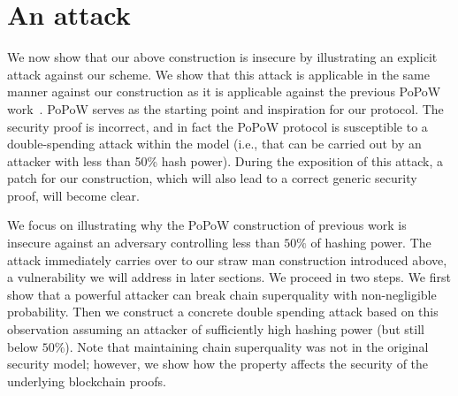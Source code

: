 \section{An attack}
\label{sec:attack}

We now show that our above construction is insecure by illustrating an explicit
attack against our scheme. We show that this attack is applicable in the same
manner against our construction as it is applicable against the previous
PoPoW work~\cite{KLS}. PoPoW serves as the starting point and inspiration for
our protocol. The security proof is incorrect, and in fact the PoPoW protocol is
susceptible to a double-spending attack within the model (i.e., that can be
carried out by an attacker with less than 50\% hash power). During the
exposition of this attack, a patch for our construction, which will also lead to
a correct generic security proof, will become clear.

We focus on illustrating why the PoPoW construction of previous work is insecure
against an adversary controlling less than $50\%$ of hashing power. The attack
immediately carries over to our straw man construction introduced above, a
vulnerability we will address in later sections. We proceed in two steps. We
first show that a powerful attacker can break chain superquality with
non-negligible probability. Then we construct a concrete double spending attack
based on this observation assuming an attacker of sufficiently high hashing
power (but still below $50\%$). Note that maintaining chain superquality was not
in the original security model; however, we show how the property affects the
security of the underlying blockchain proofs.

